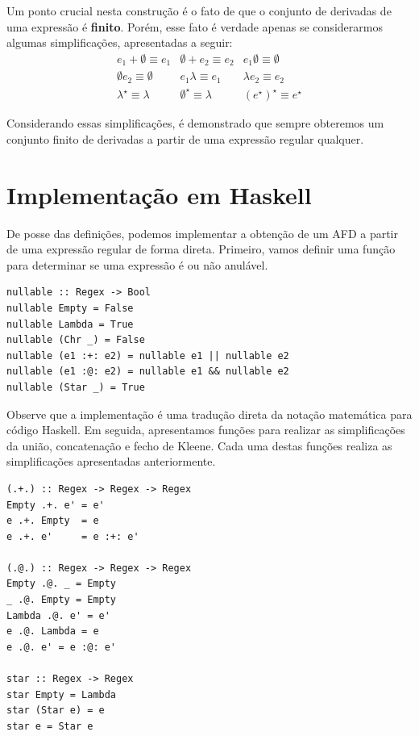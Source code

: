     Um ponto crucial nesta construção é o fato de que o conjunto de
    derivadas de uma expressão é \textbf{finito}. Porém, esse fato é
    verdade apenas se considerarmos algumas simplificações,
    apresentadas a seguir:
    \[
      \begin{array}{ccc}
        e_1 + \emptyset \equiv e_1 &
        \emptyset + e_2 \equiv e_2 &
        e_1\emptyset \equiv \emptyset \\
        \emptyset e_2 \equiv \emptyset &
        e_1 \lambda\equiv e_1 &
        \lambda e_2 \equiv e_2 \\
        \lambda^\star \equiv \lambda &
        \emptyset^\star \equiv \lambda &
        (e^\star)^\star \equiv e^\star
      \end{array}
    \]

    Considerando essas simplificações, é demonstrado que sempre
    obteremos um conjunto finito de derivadas a partir de uma
    expressão regular qualquer.

    \section{Implementação em Haskell}

    De posse das definições, podemos implementar a obtenção de um AFD
    a partir de uma expressão regular de forma direta. Primeiro,
    vamos definir uma função para determinar se uma expressão é ou não anulável.

\begin{verbatim}
nullable :: Regex -> Bool
nullable Empty = False
nullable Lambda = True
nullable (Chr _) = False
nullable (e1 :+: e2) = nullable e1 || nullable e2
nullable (e1 :@: e2) = nullable e1 && nullable e2
nullable (Star _) = True
\end{verbatim}

    Observe que a implementação é uma tradução direta da notação
    matemática para código Haskell. Em seguida, apresentamos funções
    para realizar as simplificações da união, concatenação e fecho de
    Kleene. Cada uma destas funções realiza as simplificações
    apresentadas anteriormente.

\begin{verbatim}
(.+.) :: Regex -> Regex -> Regex
Empty .+. e' = e'
e .+. Empty  = e
e .+. e'     = e :+: e'

(.@.) :: Regex -> Regex -> Regex
Empty .@. _ = Empty
_ .@. Empty = Empty
Lambda .@. e' = e'
e .@. Lambda = e
e .@. e' = e :@: e'

star :: Regex -> Regex
star Empty = Lambda
star (Star e) = e
star e = Star e
\end{verbatim}

